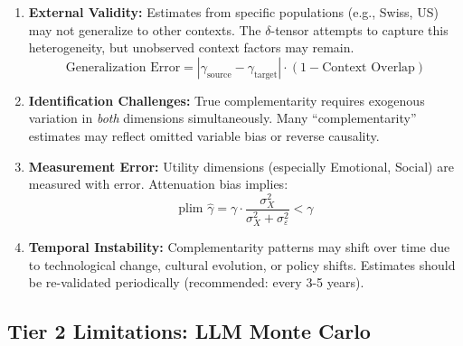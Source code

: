 \documentclass[11pt,a4paper]{article}
\theoremstyle{definition}
\begin{document}
\begin{enumerate}
    \item \textbf{External Validity:}
    Estimates from specific populations (e.g., Swiss, US) may not generalize 
    to other contexts. The $\delta$-tensor attempts to capture this heterogeneity, 
    but unobserved context factors may remain.
    \begin{equation}
    \text{Generalization Error} = |\gamma_{\text{source}} - \gamma_{\text{target}}| \cdot (1 - \text{Context Overlap})
    \end{equation}
    
    \item \textbf{Identification Challenges:}
    True complementarity requires exogenous variation in \textit{both} dimensions 
    simultaneously. Many ``complementarity'' estimates may reflect omitted variable 
    bias or reverse causality.
    
    \item \textbf{Measurement Error:}
    Utility dimensions (especially Emotional, Social) are measured with error. 
    Attenuation bias implies:
    \begin{equation}
    \text{plim } \hat{\gamma} = \gamma \cdot \frac{\sigma^2_X}{\sigma^2_X + \sigma^2_\varepsilon} < \gamma
    \end{equation}
    
    \item \textbf{Temporal Instability:}
    Complementarity patterns may shift over time due to technological change, 
    cultural evolution, or policy shifts. Estimates should be re-validated 
    periodically (recommended: every 3-5 years).
\end{enumerate}

\subsection{Tier 2 Limitations: LLM Monte Carlo}
\end{document}
